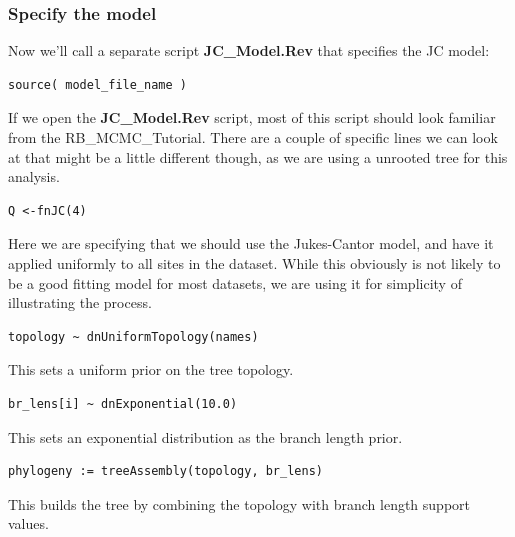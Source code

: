 \subsubsection{Specify the model}

Now we'll call a separate script \textbf{JC\_Model.Rev} that specifies the JC model:
{\tt \begin{Snugshade}[184,207,236]
\begin{lstlisting}
source( model_file_name ) 
\end{lstlisting}
\end{Snugshade}}

If we open the \textbf{JC\_Model.Rev} 
script, most of this script should look familiar from the RB\_MCMC\_Tutorial. There are a couple of specific 
lines we can look at that might be a little different though, as we are using a unrooted tree for this
analysis. 

{\tt \begin{Snugshade}[184,207,236]
\begin{lstlisting}
Q <-fnJC(4)
\end{lstlisting}
\end{Snugshade}}

Here we are specifying that we should use the Jukes-Cantor model, and have it applied uniformly to all sites in 
the dataset. While this obviously is not likely to be a good fitting model for most datasets, we are using it for 
simplicity of illustrating the process. 

{\tt \begin{Snugshade}[184,207,236]
\begin{lstlisting}
topology ~ dnUniformTopology(names)
\end{lstlisting}
\end{Snugshade}}
This sets a uniform prior on the tree topology.
{\tt \begin{Snugshade}[184,207,236]
\begin{lstlisting}
br_lens[i] ~ dnExponential(10.0)
\end{lstlisting}
\end{Snugshade}}
This sets an exponential distribution as the branch length prior.
{\tt \begin{Snugshade}[184,207,236]
\begin{lstlisting}
phylogeny := treeAssembly(topology, br_lens)
\end{lstlisting}
\end{Snugshade}}
This builds the tree by combining the topology with branch length support values.

